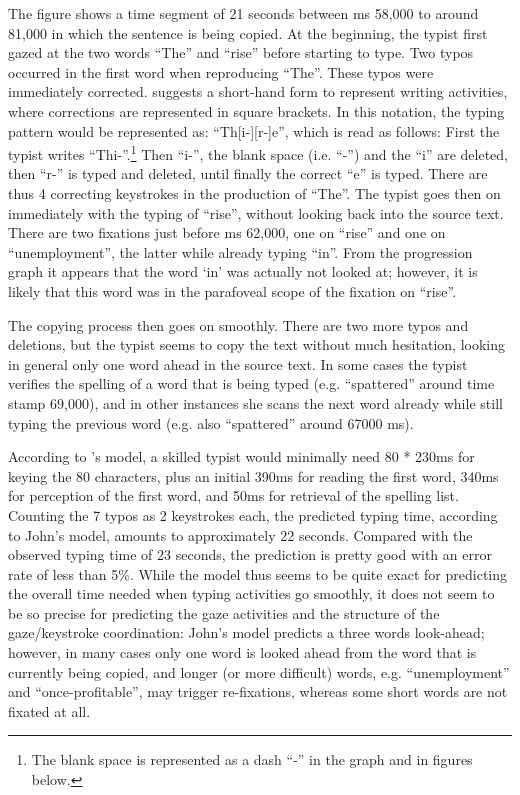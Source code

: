 \documentclass[output=paper]{LSP/langsci}
\begin{document}
The figure shows a time segment of 21 seconds between ms 58,000 to around 81,000 in which the sentence is being copied. At the beginning, the typist first gazed at the two words ``The'' and ``rise'' before starting to type. Two typos occurred in the first word when reproducing ``The''. These typos were immediately corrected. \citet{Perrin2003} suggests a short-hand form to represent writing activities, where corrections are represented in square brackets. In this notation, the typing pattern would be represented as: ``Th[i-][r-]e'', which is read as follows: First the typist writes  ``Thi-''.\footnote{The blank space is represented as a dash ``{}-'' in the graph and in figures below.}  Then ``i-'', the blank space (i.e. ``-'') and the ``i'' are deleted, then ``r-'' is typed and deleted, until finally the correct ``e'' is typed.  There are thus 4 correcting keystrokes in the production of ``The''. The typist goes then on immediately with the typing of ``rise'', without looking back into the source text. There are two fixations just before ms 62,000, one on ``rise'' and one on ``unemployment'', the latter while already typing ``in''. From the progression graph it appears that the word `in' was actually not looked at; however, it is likely that this word was in the parafoveal scope of the fixation on ``rise''. 

The copying process then goes on smoothly. There are two more typos and deletions, but the typist seems to copy the text without much hesitation, looking in general only one word ahead in the source text. In some cases the typist verifies the spelling of a word that is being typed (e.g. ``spattered'' around time stamp 69,000), and in other instances she scans the next word already while still typing the previous word (e.g. also ``spattered'' around 67000 ms). 

According to \citeauthor{John1996}'s model, a skilled typist would minimally need 80 * 230ms for keying the 80 characters, plus an initial 390ms for reading the first word, 340ms for perception of the first word, and 50ms for retrieval of the spelling list. Counting the 7 typos as 2 keystrokes each, the predicted typing time, according to John's model, amounts to approximately 22 seconds. Compared with the observed typing time of 23 seconds, the prediction is pretty good with an error rate of less than 5\%. While the model thus seems to be quite exact for predicting the overall time needed when typing activities go smoothly, it does not seem to be so precise for predicting the gaze activities and the structure of the gaze/keystroke coordination: John's model predicts a three words look-ahead; however, in many cases only one word is looked ahead from the word that is currently being copied, and longer (or more difficult) words, e.g. ``unemployment'' and ``once-profitable'', may trigger re-fixations, whereas some short words are not fixated at all. 
\end{document}
